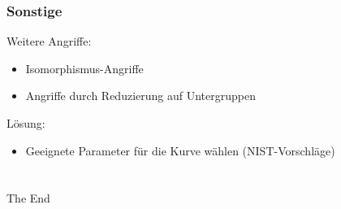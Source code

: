 \documentclass{beamer}
\theoremstyle{plain}
\theoremstyle{definition}
\theoremstyle{rem}
\begin{document}
\begin{frame}
    \frametitle{Sonstige}
    Weitere Angriffe:
    \begin{itemize}
        \item Isomorphismus-Angriffe
        \item Angriffe durch Reduzierung auf Untergruppen
    \end{itemize}
    \pause
    Lösung:
    \begin{itemize}
        \item Geeignete Parameter für die Kurve wählen (NIST-Vorschläge)
    \end{itemize}
\end{frame}

\section*{}

\begin{frame}
    \Huge{\centerline{The End}}
    \vfill
\end{frame}

\end{document}
